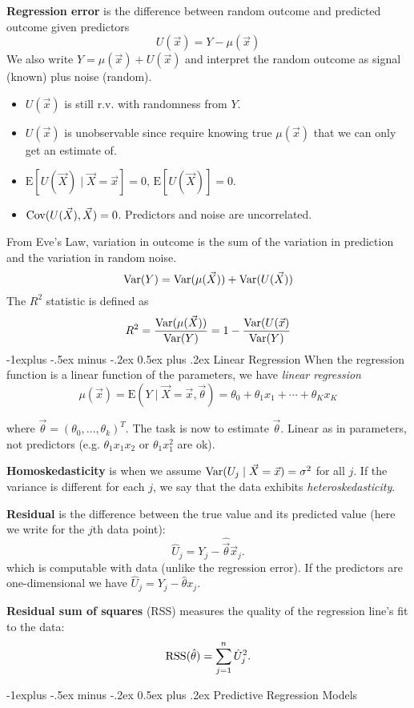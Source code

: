 \documentclass[10pt,landscape]{article}
\makeatletter
\renewcommand{\subsection}{\@startsection{subsection}{2}{0mm}%
                                {-1explus -.5ex minus -.2ex}%
                                {0.5ex plus .2ex}%
                                {\normalfont\normalsize\bfseries}}
\newcommand{\E}{\text{E}}
\makeatother
\begin{document}
\begin{multicols*}{3}
\textbf{Regression error} is the difference between random outcome and predicted outcome given predictors
$$
U(\vec{x})=Y-\mu(\vec{x})
$$
We also write $Y=\mu(\vec{x})+U(\vec{x})$ and interpret the random outcome as signal (known) plus noise (random).
\begin{itemize}
    \item $U(\vec{x})$ is still r.v. with randomness from $Y$.
    \item $U(\vec{x})$ is unobservable since require knowing true $\mu(\vec{x})$ that we can only get an estimate of.
    \item $\E[U(\vec{X})\mid\vec{X}=\vec{x}]=0,\,\E[U(\vec{X})]=0$.
    \item $\operatorname{Cov}(U(\vec{X}),\vec{X})=0$. Predictors and noise are uncorrelated.
\end{itemize}
From Eve's Law, variation in outcome is the sum of the variation in prediction and the variation in random noise.
$$
\operatorname{Var}(Y)=\operatorname{Var}(\mu(\vec{X}))+\operatorname{Var}(U(\vec{X}))
$$
The $R^2$ statistic is defined as
$$
R^2=\frac{\operatorname{Var}(\mu(\vec{X}))}{\operatorname{Var}(Y)}=1-\frac{\operatorname{Var}(U(\vec{x})}{\operatorname{Var}(Y)}
$$
\subsection{Linear Regression}
When the regression function is a linear function of the parameters, we have \emph{linear regression}
$$\mu(\vec{x})=\E (Y\mid \vec{X}=\vec{x},\vec{\theta})=\theta_0+\theta_1x_1+\cdots+\theta_K x_K$$

where $\vec{\theta}=(\theta_0,\ldots,\theta_k)^T$. The task is now to estimate $\vec{\theta}$. Linear as in parameters, not predictors (e.g. $\theta_1 x_1 x_2$ or $\theta_1 x_1^2$ are ok).

\textbf{Homoskedasticity} is when we assume $\operatorname{Var} (U_j\mid \vec{X}={\vec x})=\sigma^2$ for all $j$. If the variance is different for each $j$, we say that the data exhibits \emph{heteroskedasticity}.

\textbf{Residual} is the difference between the true value and its predicted value (here we write for the $j$th data point):
$$\hat{U}_j=Y_j-\hat{\vec\theta}\vec x_j.$$
which is computable with data (unlike the regression error). If the predictors are one-dimensional we have $\hat{U}_j=Y_j-\hat{\theta} x_j.$

\textbf{Residual sum of squares} (RSS) measures the quality of the regression line's fit to the data:$$\operatorname{RSS}(\hat{\theta})=\sum_{j=1}^n \hat{U}_j^2.$$

\subsection{Predictive Regression Models}


\end{multicols*}
\end{document}
